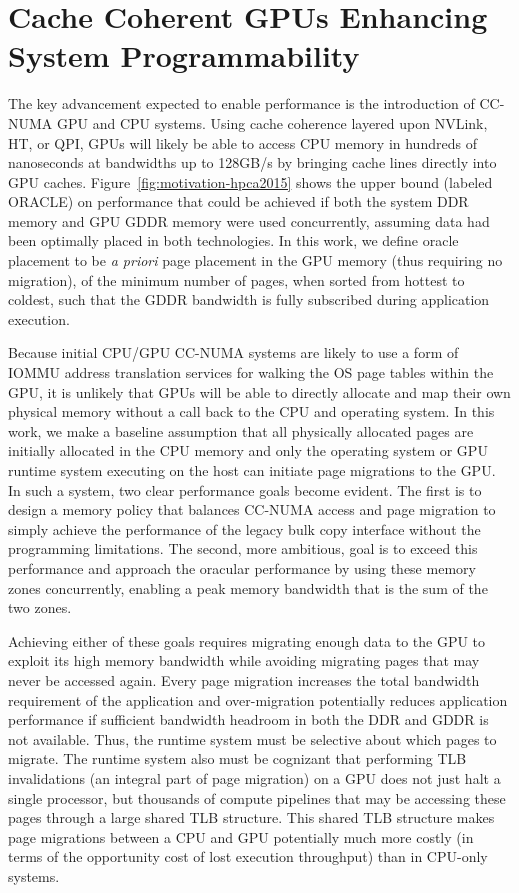 \section {Cache Coherent GPUs Enhancing System Programmability}
The key advancement expected to enable performance is the introduction of
CC-NUMA GPU and CPU systems.  Using cache coherence layered upon NVLink, HT, or
QPI, GPUs will likely be able to access CPU memory in hundreds of nanoseconds at
bandwidths up to 128GB/s by bringing cache lines directly into GPU caches.
Figure~\ref{fig:motivation-hpca2015} shows the upper bound (labeled ORACLE) on
performance that could be achieved if both the system DDR memory and GPU GDDR
memory were used concurrently, assuming data had been optimally placed in both
technologies.  In this work, we define oracle placement to be \emph{a priori}
page placement in the GPU memory (thus requiring no migration), of the minimum
number of pages, when sorted from hottest to coldest, such that the GDDR
bandwidth is fully subscribed during application execution.

Because initial CPU/GPU CC-NUMA systems are likely to use a form of IOMMU
address translation services for walking the OS page tables within the GPU,  it
is unlikely that GPUs will be able to directly allocate and map their own
physical memory without a call back to the CPU and operating system.  In this
work, we make a baseline assumption that all physically allocated pages are
initially allocated in the CPU memory and only the operating system or GPU
runtime system executing on the host can initiate page migrations to the GPU\@.
In such a system, two clear performance goals become evident.  The first is to
design a memory policy that balances CC-NUMA access and page migration to simply
achieve the performance of the legacy bulk copy interface without the
programming limitations.  The second, more ambitious, goal is to exceed this
performance and approach the oracular performance by using these memory zones
concurrently, enabling a peak memory bandwidth that is the sum of the two zones.

Achieving either of these goals requires migrating enough data to the GPU to
exploit its high memory bandwidth while avoiding migrating pages that may never
be accessed again.  Every page migration increases the total bandwidth
requirement of the application and over-migration potentially reduces
application performance if sufficient bandwidth headroom in both the DDR and
GDDR is not available.  Thus, the runtime system must be selective about which
pages to migrate.  The runtime system also must be cognizant that performing TLB
invalidations (an integral part of page migration) on a GPU does not just halt a
single processor, but thousands of compute pipelines that may be accessing these
pages through a large shared TLB structure.  This shared TLB structure makes
page migrations between a CPU and GPU potentially much more costly (in terms of
the opportunity cost of lost execution throughput) than in CPU-only systems.

